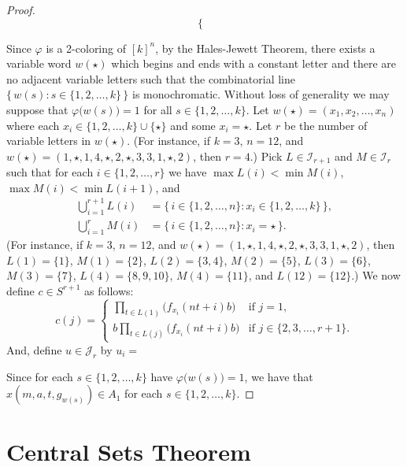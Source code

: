 \documentclass[12pt]{article}
\theoremstyle{plain}
\theoremstyle{definition}
\newcommand{\calI}{\mathcal{I}}
\newcommand{\calJ}{\mathcal{J}}
\begin{document}
\begin{proof}
\[\begin{cases}
    \end{cases}
  \]
  
  Since $\varphi$ is a 2-coloring of $[k]^n$, by the Hales-Jewett Theorem, there exists a variable word $w(\star)$ which begins and ends with a constant letter and there are no adjacent variable letters such that the combinatorial line $\bigl\{\, w(s) : s \in \{1, 2, \ldots, k\} \,\bigr\}$ is monochromatic. 
  Without loss of generality we may suppose that $\varphi\bigl( w(s) \bigr) = 1$ for all $s \in \{1, 2, \ldots, k\}$.
  Let $w(\star) = (x_1, x_2, \ldots, x_n)$ where each $x_i \in \{1, 2, \ldots, k\} \cup \{\star\}$ and some $x_i = \star$.
  Let $r$ be the number of variable letters in $w(\star)$.
  (For instance, if $k = 3$, $n = 12$, and $w(\star) = (1, \star, 1, 4, \star, 2, \star, 3, 3, 1, \star, 2)$, then $r = 4$.)
  Pick $L \in \calI_{r+1}$ and $M \in \calI_r$ such that for each $i \in \{1, 2, \ldots, r\}$ we have $\max L(i) < \min M(i)$, $\max M(i) < \min L(i+1)$, and 
  \begin{align*}
    \bigcup_{i=1}^{r+1} L(i) &= \bigl\{\, i \in \{1, 2, \ldots, n\} : x_i \in \{1, 2, \ldots, k\} \,\bigr\}, \\
    \bigcup_{i=1}^r M(i) &= \bigl\{\, i \in \{1, 2, \ldots, n\} : x_i = \star \,\}.
  \end{align*}
  (For instance, if $k = 3$, $n = 12$, and $w(\star) = (1, \star, 1, 4, \star, 2, \star, 3, 3, 1, \star, 2)$, then $L(1) = \{1\}$, $M(1) = \{2\}$, $L(2) = \{3, 4\}$, $M(2) = \{5\}$, $L(3) = \{6\}$, $M(3) = \{7\}$, $L(4) = \{8, 9, 10\}$, $M(4) = \{11\}$, and $L(12) = \{12\}$.)
  We now define $c \in S^{r+1}$ as follows:
  \[
    c(j) =
    \begin{cases}
      \prod_{t \in L(1)} \bigl( f_{x_i}(nt+i)b \bigr) & \mbox{if $j = 1$,} \\
      b\prod_{t \in L(j)} \bigl( f_{x_i}(nt+i)b \bigr) & \mbox{if $j \in \{2, 3, \ldots, r+1\}$.}
    \end{cases}
  \]
  And, define $u \in \calJ_r$ by $u_i = $
  
  Since for each $s \in \{1, 2, \ldots, k\}$ have $\varphi\bigl( w(s) \bigr) = 1$, we have that $x(m, a, t, g_{w(s)}) \in A_1$ for each $s \in \{1, 2, \ldots, k\}$.
\end{proof}


\section{Central Sets Theorem}




\end{document}
